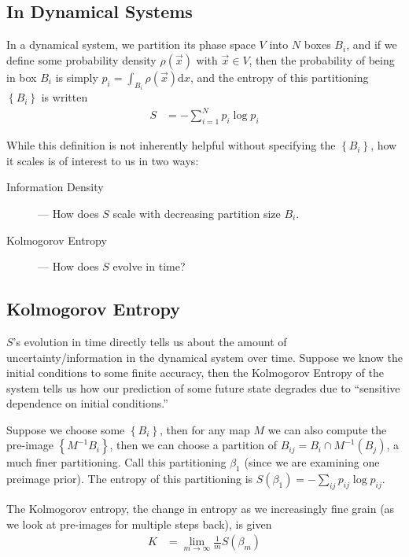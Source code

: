 \documentclass[10pt]{article}
\begin{document}
\subsection{In Dynamical Systems}

In a dynamical system, we partition its phase space $V$ into $N$ boxes $B_i$,
and if we define some probability density $\rho(\vec{x})$ with $\vec{x} \in V$,
then the probability of being in box $B_i$ is simply
$p_i = \int_{B_i}\rho(\vec{x})\mathrm{d}x$,
and the entropy of this partitioning
$\left\{ B_i \right\}$
is written
\begin{align}
    S &= -\sum\limits_{i=1}^{N}p_i\log p_i
\end{align}

While this definition is not inherently helpful without specifying the
$\left\{B_i\right\}$, how it scales is of interest to us in two ways:
\begin{description}
    \item[Information Density] --- How does $S$ scale with decreasing partition
        size $B_i$.
    \item[Kolmogorov Entropy] --- How does $S$ evolve in time?
\end{description}

\subsection{Kolmogorov Entropy}

$S$'s evolution in time directly tells us about the amount of
uncertainty/information in the dynamical system over time. Suppose we know the
initial conditions to some finite accuracy, then the Kolmogorov Entropy of the
system tells us how our prediction of some future state degrades due to
``sensitive dependence on initial conditions.''

Suppose we choose some $\left\{ B_i \right\}$, then for any map $M$ we can also
compute the pre-image $\left\{ M^{-1} B_i\right\}$, then we can choose a
partition of $B_{ij} = B_i \cap M^{-1}(B_j)$, a much finer partitioning. Call
this partitioning $\beta_1$ (since we are examining one preimage prior). The
entropy of this partitioning is
$S(\beta_1) = -\sum\limits_{ij}^{} p_{ij}\log p_{ij}$.

The Kolmogorov entropy, the change in entropy as we increasingly fine grain (as
we look at pre-images for multiple steps back), is given
\begin{align}
    K &= \lim_{m \to \infty} \frac{1}{m}S(\beta_m)
\end{align}
\end{document}
